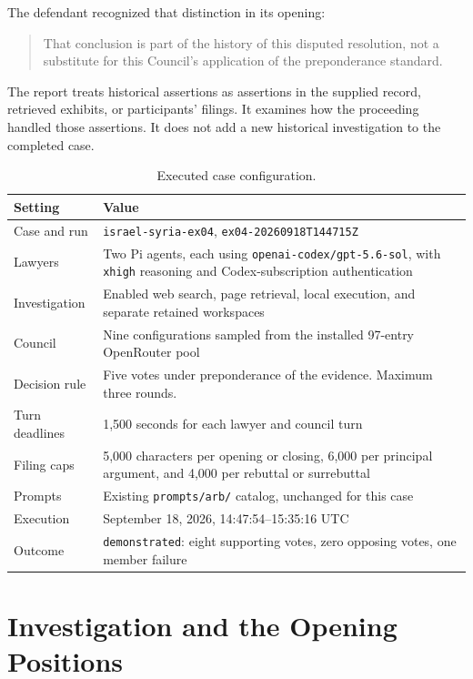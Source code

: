 \documentclass[11pt]{article}
\newcommand{\code}[1]{\texttt{#1}}
\begin{document}
The defendant recognized that distinction in its opening:
\begin{quote}
That conclusion is part of the history of this disputed resolution, not a substitute for this Council's application of the preponderance standard.
\end{quote}
The report treats historical assertions as assertions in the supplied record, retrieved exhibits, or participants' filings.  It examines how the proceeding handled those assertions.  It does not add a new historical investigation to the completed case.

\begin{table}[htbp]
\centering
\small
\caption{Executed case configuration.}
\label{tab:config}
\begin{tabularx}{\textwidth}{@{}L{0.27\textwidth}Y@{}}
\toprule
Setting & Value \\
\midrule
Case and run & \code{israel-syria-ex04}, \code{ex04-20260918T144715Z} \\
Lawyers & Two Pi agents, each using \code{openai-codex/gpt-5.6-sol}, with \code{xhigh} reasoning and Codex-subscription authentication \\
Investigation & Enabled web search, page retrieval, local execution, and separate retained workspaces \\
Council & Nine configurations sampled from the installed 97-entry OpenRouter pool \\
Decision rule & Five votes under preponderance of the evidence.  Maximum three rounds. \\
Turn deadlines & 1,500 seconds for each lawyer and council turn \\
Filing caps & 5,000 characters per opening or closing, 6,000 per principal argument, and 4,000 per rebuttal or surrebuttal \\
Prompts & Existing \code{prompts/arb/} catalog, unchanged for this case \\
Execution & September 18, 2026, 14:47:54--15:35:16 UTC \\
Outcome & \code{demonstrated}: eight supporting votes, zero opposing votes, one member failure \\
\bottomrule
\end{tabularx}
\end{table}

\section{Investigation and the Opening Positions}
\end{document}
